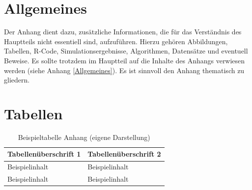 \begin{appendices}


\section*{Allgemeines}\label{Allgemeines}

Der Anhang dient dazu, zusätzliche Informationen, die für das Verständnis des Hauptteils nicht essentiell sind, aufzuführen. Hierzu gehören Abbildungen, Tabellen, \textsf{R}-Code, Simulationsergebnisse, Algorithmen, Datensätze und eventuell Beweise. Es sollte trotzdem im Hauptteil auf die Inhalte des Anhangs verwiesen werden (siehe Anhang \ref{Allgemeines}). Es ist sinnvoll den Anhang thematisch zu gliedern.

\section*{Tabellen}

\begin{table}[H]
    \centering
    \caption{Beispieltabelle Anhang (eigene Darstellung)}
    \begin{tabular}{|l|l|}
    \hline
        Tabellenüberschrift 1 &  Tabellenüberschrift 2\\
        \hline
         Beispielinhalt & Beispielinhalt\\
         \hline
         Beispielinhalt & Beispielinhalt\\
         \hline
    \end{tabular}
    \label{tab:my_label1}
\end{table}

\end{appendices}